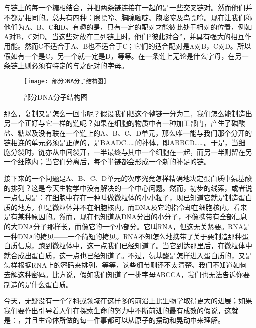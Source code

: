 \documentclass[12pt,oneside]{book}
\begin{document}
\begin{common-format}
与链上的每一个糖相结合，并把两条链连接在一起的是一些交叉链对。然而他们并不都是相同的。总共有四种：腺嘌呤、胸腺嘧啶、胞嘧啶及鸟嘌呤。现在让我们称他们为A、B、C和D。有趣的是，只有一定的配对才能彼此处于相对的位置，例如A对B，C对D。当这些对放在二列链上时，他们“彼此对合”，并具有强大的相互作用能。然而C不适合于A、B也不适合于C；它们的适合配对是A对B，C对D。所以假如有一个是C，另一个就一定是D，等等。在一条链上无论是什么字母，在另一条链上则必须有特定的与之配对的字母。

\begin{wrapfigure}{l}{0.5\textwidth}
\texttt{[image: 部分DNA分子结构图]}
\caption{部分DNA分子结构图}
\label{fig:部分DNA分子结构图}
\end{wrapfigure}

那么，复制又是怎么一回事呢？假设我们把这个整链一分为二，我们怎么能制造出另一个正好与它一样的链呢？如果在细胞的物质中有一种加工部门，产生了磷酸盐、糖以及没有联在一个链上的A、B、C、D单元，那么唯一能与我们那个分开的链相连的单元必须是正确的，是BAADC……的补体，即ABBCD……。于是，当细胞分裂时，链亦从中间裂开，一半最终与其中一个细胞在一起，而另一半则留在另一个细胞内；当它们分离后，每个半链都会形成一个新的补足的链。


接下来的一个问题是A、B、C、D单元的次序究竟怎样精确地决定蛋白质中氨基酸的排列？这是今天生物学中没有解决的一个中心问题。然而，初步的线索，或者说一点信息是：在细胞中存在一种叫做微粒体的小小粒子，现已知道它就是制造蛋白质的地方。但是微粒体并不在细胞核内，而DNA及它的指令却在细胞核内。看来是有某种原因的。然而，现在也知道从DNA分出的小分子，不像携带有全部信息的大DNA分子那样长，而像它的一个小部分。它叫RNA，但这无关紧要。RNA是一种DNA的拷贝——一个简短的拷贝。RNA不知怎么地携带了关于要制造那种蛋白质信息，跑到微粒体中，这一点我们已经知道了。当它到达那里后，在微粒体中就合成出蛋白质，这一点也已经知道了。不过，氨基酸是怎样进入蛋白质的，又是怎样根据RNA上的密码来排列，等等，这些细节则还不太清楚。我们不知道如何去解这种密码。比方说，假如我们知道了一排字母ABCCA，我们也无法告诉你要制造的是什么蛋白质。


今天，无疑没有一个学科或领域在这样多的前沿上比生物学取得更大的进展；如果我们要作出引导着人们在探索生命的努力中不断前进的最有成效的假说，这就是：，并且生命体所做的每一件事都可以从原子的摆动和晃动中来理解。



\end{common-format}
\end{document}

